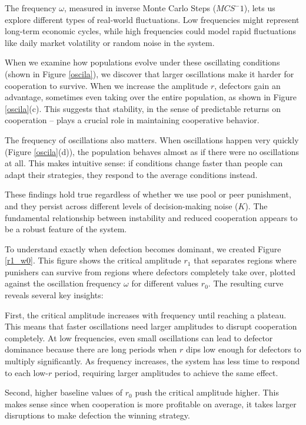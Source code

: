 The frequency $\omega$, measured in inverse Monte Carlo Steps ($MCS^-1$), lets us explore different types of real-world fluctuations. Low frequencies might represent long-term economic cycles, while high frequencies could model rapid fluctuations like daily market volatility or random noise in the system.

When we examine how populations evolve under these oscillating conditions (shown in Figure \ref{oscila}), we discover that larger oscillations make it harder for cooperation to survive. When we increase the amplitude $r$, defectors gain an advantage, sometimes even taking over the entire population, as shown in Figure \ref{oscila}(c). This suggests that stability, in the sense of predictable returns on cooperation – plays a crucial role in maintaining cooperative behavior.

The frequency of oscillations also matters. When oscillations happen very quickly (Figure \ref{oscila}(d)), the population behaves almost as if there were no oscillations at all. This makes intuitive sense: if conditions change faster than people can adapt their strategies, they respond to the average conditions instead.

These findings hold true regardless of whether we use pool or peer punishment, and they persist across different levels of decision-making noise ($K$). The fundamental relationship between instability and reduced cooperation appears to be a robust feature of the system.

To understand exactly when defection becomes dominant, we created Figure \ref{r1_w0}. This figure shows the critical amplitude $r_1$ that separates regions where punishers can survive from regions where defectors completely take over, plotted against the oscillation frequency $\omega$ for different values $r_0$. The resulting curve reveals several key insights:

First, the critical amplitude increases with frequency until reaching a plateau. This means that faster oscillations need larger amplitudes to disrupt cooperation completely. At low frequencies, even small oscillations can lead to defector dominance because there are long periods when $r$ dips low enough for defectors to multiply significantly. As frequency increases, the system has less time to respond to each low-$r$ period, requiring larger amplitudes to achieve the same effect.

Second, higher baseline values of $r_0$ push the critical amplitude higher. This makes sense since when cooperation is more profitable on average, it takes larger disruptions to make defection the winning strategy.

